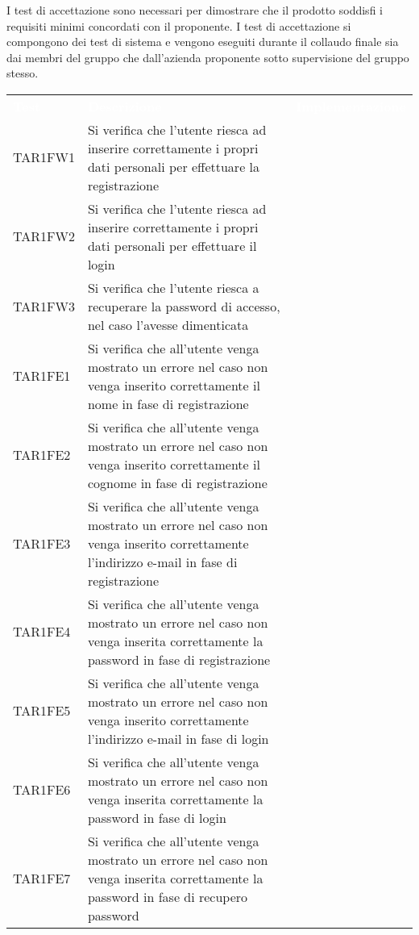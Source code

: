I test di accettazione sono necessari per dimostrare che il prodotto soddisfi i requisiti minimi concordati con il proponente.
I test di accettazione si compongono dei test di sistema e vengono eseguiti durante il collaudo finale sia dai membri del gruppo che dall’azienda proponente sotto supervisione del gruppo
stesso.
\renewcommand{\arraystretch}{1.5}
\begin{longtable}{ m{}<{\centering}  m{}<{\centering}  m{}<{\centering} }
	\rowcolor{darkblue}
	\textcolor{white}{\textbf{Test}} &\textcolor{white}{\textbf{Descrizione}} & \textcolor{white}{\textbf{Implementazione}} \\ 

	TAR1FW1 & Si verifica che l'utente riesca ad inserire correttamente i propri dati personali per effettuare la registrazione & \Su \\
	TAR1FW2 & Si verifica che l'utente riesca ad inserire correttamente i propri dati personali per effettuare il login & \Su \\
	TAR1FW3 & Si verifica che l'utente riesca a recuperare la password di accesso, nel caso l'avesse dimenticata & \Su \\
	TAR1FE1 & Si verifica che all'utente venga mostrato un errore nel caso non venga inserito correttamente il nome in fase di registrazione & \Su \\
	TAR1FE2 & Si verifica che all'utente venga mostrato un errore nel caso non venga inserito correttamente il cognome in fase di registrazione & \Su \\
	TAR1FE3 & Si verifica che all'utente venga mostrato un errore nel caso non venga inserito correttamente l'indirizzo e-mail in fase di registrazione & \Su \\
	TAR1FE4 & Si verifica che all'utente venga mostrato un errore nel caso non venga inserita correttamente la password in fase di registrazione & \Su \\
	TAR1FE5 & Si verifica che all'utente venga mostrato un errore nel caso non venga inserito correttamente l'indirizzo e-mail in fase di login & \Su \\
	TAR1FE6 & Si verifica che all'utente venga mostrato un errore nel caso non venga inserita correttamente la password in fase di login & \Su \\
	TAR1FE7 & Si verifica che all'utente venga mostrato un errore nel caso non venga inserita correttamente la password in fase di recupero password & \Su \\

\end{longtable}
